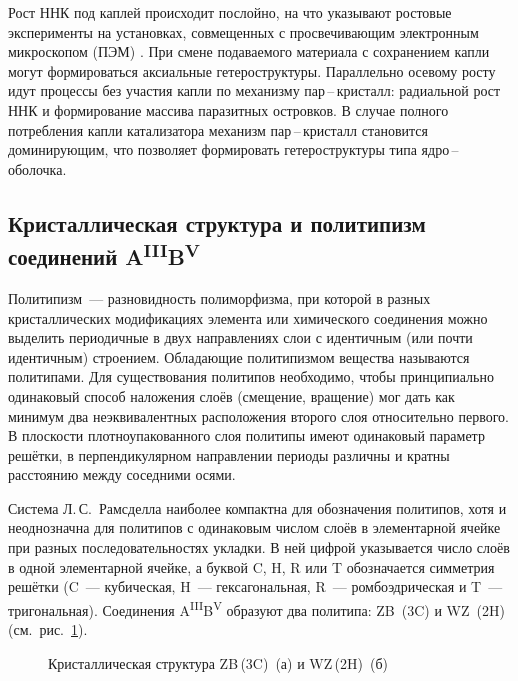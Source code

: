 Рост ННК под каплей происходит послойно, на что указывают ростовые эксперименты на установках, совмещенных с просвечивающим электронным микроскопом (ПЭМ) \cite{Hofmann2008, Wen2009, Jacobsson2016}. При смене подаваемого материала с сохранением капли могут формироваться аксиальные гетероструктуры. Параллельно осевому росту идут процессы без участия капли по механизму пар\,--\,кристалл: радиальной рост ННК и формирование массива паразитных островков. В случае полного потребления капли катализатора механизм пар\,--\,кристалл становится доминирующим, что позволяет формировать гетероструктуры типа ядро\,--\,оболочка.

\subsection{Кристаллическая структура и политипизм соединений A\textsuperscript{III}B\textsuperscript{V}}\label{subsec:ch1/sec2/sub3}

Политипизм~--- разновидность полиморфизма, при которой в разных кристаллических модификациях элемента или химического соединения можно выделить периодичные в двух направлениях слои с идентичным (или почти идентичным) строением. Обладающие политипизмом вещества называются политипами. Для существования политипов необходимо, чтобы принципиально одинаковый способ наложения слоёв (смещение, вращение) мог дать как минимум два неэквивалентных расположения второго слоя относительно первого. В плоскости плотноупакованного слоя политипы имеют одинаковый параметр решётки, в перпендикулярном направлении периоды различны и кратны расстоянию между соседними осями.

Система Л.\,С.~Рамсделла наиболее компактна для обозначения политипов, хотя и неоднозначна для политипов с одинаковым числом слоёв в элементарной ячейке при разных последовательностях укладки. В ней цифрой указывается число слоёв в одной элементарной ячейке, а буквой C, H, R или T обозначается симметрия решётки (C~--- кубическая, H~--- гексагональная, R~--- ромбоэдрическая и T~--- тригональная). Соединения A\textsuperscript{III}B\textsuperscript{V} образуют два политипа: ZB~(3C) и WZ~(2H) (см.~рис.~\cref{fig:Image_5}).

\begin{figure}[ht]
	\caption{Кристаллическая структура ZB\,(3C)~(а) и WZ\,(2H)~(б)}\label{fig:Image_5}
\end{figure}

